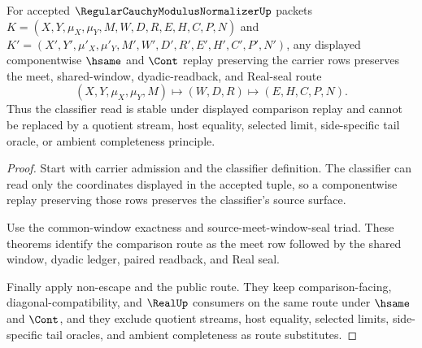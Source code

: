 \begin{theorem}
\label{thm:regular-cauchy-modulus-normalizer-comparison-stability}
For accepted $\RegularCauchyModulusNormalizerUp$ packets
$K=(X,Y,\mu_X,\mu_Y,M,W,D,R,E,H,C,P,N)$ and
$K'=(X',Y',\mu'_X,\mu'_Y,M',W',D',R',E',H',C',P',N')$, any displayed
componentwise $\hsame$ and $\Cont$ replay preserving the carrier rows preserves
the meet, shared-window, dyadic-readback, and Real-seal route
$$
(X,Y,\mu_X,\mu_Y,M) \longmapsto (W,D,R) \longmapsto (E,H,C,P,N).
$$
Thus the classifier read is stable under displayed comparison replay and cannot
be replaced by a quotient stream, host equality, selected limit, side-specific
tail oracle, or ambient completeness principle.
\end{theorem}
\begin{proof}
Start with carrier admission and the classifier definition. The classifier can
read only the coordinates displayed in the accepted tuple, so a componentwise
replay preserving those rows preserves the classifier's source surface.

Use the common-window exactness and source-meet-window-seal triad. These
theorems identify the comparison route as the meet row followed by the shared
window, dyadic ledger, paired readback, and Real seal.

Finally apply non-escape and the public route. They keep comparison-facing,
diagonal-compatibility, and $\RealUp$ consumers on the same route under
$\hsame$ and $\Cont$, and they exclude quotient streams, host equality,
selected limits, side-specific tail oracles, and ambient completeness as route
substitutes.
\end{proof}

